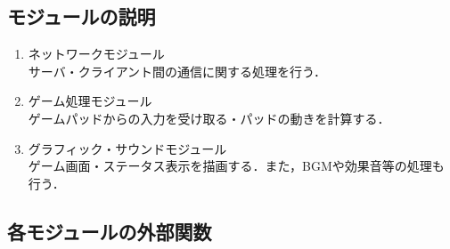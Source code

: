 \documentclass{jarticle}
\begin{document}
\subsection{モジュールの説明}
\begin{enumerate}
\item ネットワークモジュール \mbox{}\\
  サーバ・クライアント間の通信に関する処理を行う．
\item ゲーム処理モジュール \mbox{}\\
  ゲームパッドからの入力を受け取る・パッドの動きを計算する．
\item グラフィック・サウンドモジュール \mbox{}\\
  ゲーム画面・ステータス表示を描画する．また，BGMや効果音等の処理も行う．
\end{enumerate}

\subsection{各モジュールの外部関数}
\end{document}
